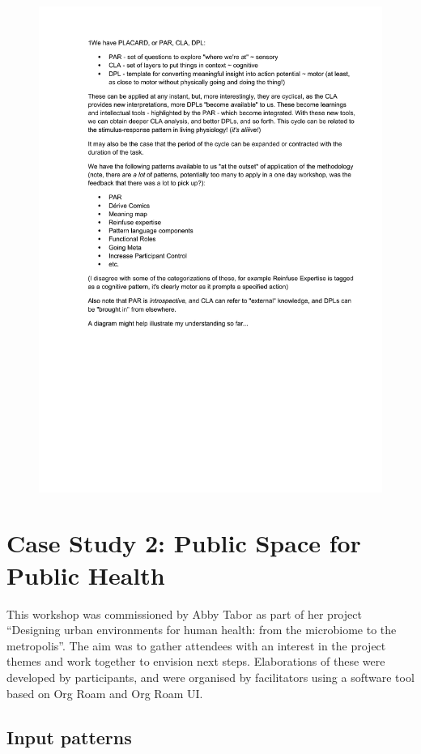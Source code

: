 \documentclass[acmlarge,timestamp]{acmart}
\begin{document}
\begin{figure}[h!]
  \includegraphics[width=.8\textwidth,page=3,trim={2cm 8cm 2cm 2cm},clip=true]{alex_thoughts}
  \caption{\label{alex-diagram}}
\end{figure}

\clearpage

\section{Case Study 2: Public Space for Public Health}

This workshop was commissioned by Abby Tabor as part of her project
“Designing urban environments for human health: from the microbiome to
the metropolis”.  The aim was to gather attendees with an interest in
the project themes and work together to envision next
steps. Elaborations of these were developed by participants, and were
organised by facilitators using a software tool based on Org Roam and
Org Roam UI.

\subsection{Input patterns}
\end{document}
